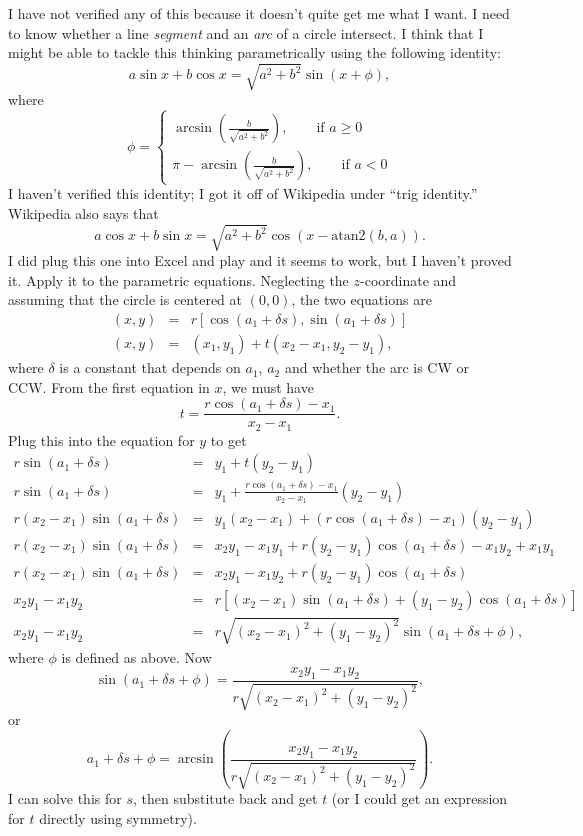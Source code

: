 \documentclass[titlepage,oneside,10pt]{article}
\begin{document}
I have not verified any of this because it doesn't quite get me what I
want. I need to know whether a line \emph{segment} and an
\emph{arc} of a circle intersect. I think that I might be able to
tackle this thinking parametrically using the following identity:
$$a\sin x + b\cos x = \sqrt{a^2+b^2}\sin(x+\phi),$$
where
\[
\phi = \left\{ \begin{array}{r}
\arcsin(\frac{b}{\sqrt{a^2+b^2}}),\qquad\mbox{if }a\geq 0\\
\pi - \arcsin(\frac{b}{\sqrt{a^2+b^2}}),\qquad\mbox{if }a<0
\end{array}\right.
\]
I haven't verified this identity; I got it off of Wikipedia under
``trig identity.'' Wikipedia also says that 
$$a\cos x + b\sin x = \sqrt{a^2+b^2}\cos(x-\mbox{atan2}(b,a)).$$
I did plug this one into Excel and play and it seems to work, but I
haven't proved it.
Apply it to the parametric equations. Neglecting
the $z$-coordinate and assuming that the circle is centered at
$(0,0)$, the two equations are 
\begin{eqnarray*}
(x,y) &=& r[\cos (a_1+\delta s),\sin(a_1+\delta s)]\\
(x,y) &=& (x_1,y_1) + t(x_2-x_1,y_2-y_1),
\end{eqnarray*}
where $\delta$ is a constant that depends on $a_1$, $a_2$ and whether
the arc is CW or CCW. From the first equation in $x$, we must have
$$t = \frac{r\cos(a_1+\delta s)-x_1}{x_2-x_1}.$$
Plug this into the equation for $y$ to get
\begin{eqnarray*}
r\sin(a_1+\delta s) &=& y_1 + t(y_2-y_1)\\
r\sin(a_1+\delta s) &=& y_1 + 
\frac{r\cos(a_1+\delta s)-x_1}{x_2-x_1}(y_2-y_1)\\
r(x_2-x_1)\sin(a_1+\delta s) &=& y_1(x_2-x_1) + 
(r\cos(a_1+\delta s)-x_1)(y_2-y_1)\\
r(x_2-x_1)\sin(a_1+\delta s) &=& x_2y_1-x_1y_1 + 
r(y_2-y_1)\cos(a_1+\delta s)-x_1y_2+x_1y_1\\
r(x_2-x_1)\sin(a_1+\delta s) &=& x_2y_1 -x_1y_2 +
r(y_2-y_1)\cos(a_1+\delta s)\\
x_2y_1-x_1y_2 &=& r[(x_2-x_1)\sin(a_1+\delta s)+(y_1-y_2)\cos(a_1+\delta s)]\\
x_2y_1-x_1y_2 &=& r\sqrt{(x_2-x_1)^2+(y_1-y_2)^2}\sin(a_1+\delta s + \phi),
\end{eqnarray*}
where $\phi$ is defined as above. Now
$$\sin(a_1+\delta s + \phi) =
\frac{x_2y_1-x_1y_2}{r\sqrt{(x_2-x_1)^2+(y_1-y_2)^2}},$$
or
$$a_1+\delta s + \phi =
\arcsin\left(\frac{x_2y_1-x_1y_2}{r\sqrt{(x_2-x_1)^2+(y_1-y_2)^2}}\right).$$
I can solve this for $s$, then substitute back and get $t$ (or I could
get an expression for $t$ directly using symmetry).
\end{document}
